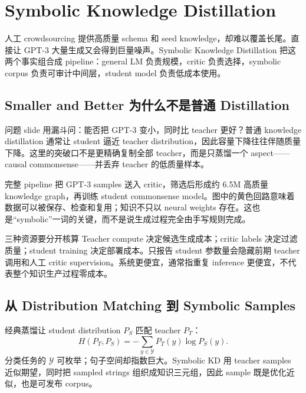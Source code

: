 \section{Symbolic Knowledge Distillation}

人工 crowdsourcing 提供高质量 schema 和 seed knowledge，却难以覆盖长尾。直接让 GPT-3 大量生成又会得到巨量噪声。Symbolic Knowledge Distillation 把这两个事实组合成 pipeline：general LM 负责规模，critic 负责选择，symbolic corpus 负责可审计中间层，student model 负责低成本使用。

\subsection{Smaller and Better 为什么不是普通 Distillation}

问题 slide 用漏斗问：能否把 GPT-3 变小，同时比 teacher 更好？普通 knowledge distillation 通常让 student 逼近 teacher distribution，因此容量下降往往伴随质量下降。这里的突破口不是更精确复制全部 teacher，而是只蒸馏一个 aspect——causal commonsense——并丢弃 teacher 的低质量样本。


完整 pipeline 把 GPT-3 samples 送入 critic，筛选后形成约 6.5M 高质量 knowledge graph，再训练 student commonsense model。图中的黄色回路意味着数据可以被保存、检查和复用；知识不只以 neural weights 存在。这也是“symbolic”一词的关键，而不是说生成过程完全由手写规则完成。


\begin{importantbox}{三种资源要分开核算}
Teacher compute 决定候选生成成本；critic labels 决定过滤质量；student training 决定部署成本。只报告 student 参数量会隐藏前期 teacher 调用和人工 critic supervision。系统更便宜，通常指重复 inference 更便宜，不代表整个知识生产过程零成本。
\end{importantbox}

\subsection{从 Distribution Matching 到 Symbolic Samples}

经典蒸馏让 student distribution $P_S$ 匹配 teacher $P_T$：
\begin{equation}
H(P_T,P_S)=-\sum_{y\in\mathcal{Y}}P_T(y)\log P_S(y).
\end{equation}
分类任务的 $\mathcal{Y}$ 可枚举；句子空间却指数巨大。Symbolic KD 用 teacher samples 近似期望，同时把 sampled strings 组织成知识三元组，因此 sample 既是优化近似，也是可发布 corpus。

